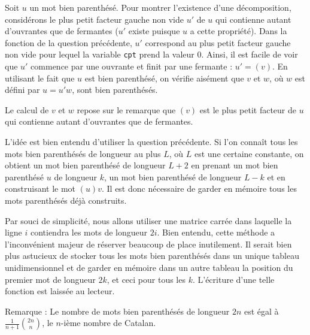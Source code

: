 Soit $u$ un mot bien parenthésé. Pour montrer l'existence d'une décomposition, considérons le plus petit facteur gauche non vide $u'$ de $u$ qui contienne autant d'ouvrantes que de fermantes ($u'$ existe puisque $u$ a cette propriété). Dans la fonction de la question précédente, $u'$ correspond au plus petit facteur gauche non vide pour lequel la variable \texttt{cpt} prend la valeur 0. Ainsi, il est facile de voir que $u'$ commence par une ouvrante et finit par une fermante : $u'=(v)$. En utilisant le fait que $u$ est bien parenthésé, on vérifie aisément que $v$ et $w$, où $w$ est défini par $u=u'w$, sont bien parenthésés.
\medskip

Le calcul de $v$ et $w$ repose sur le remarque que $(v)$ est le plus petit facteur de $u$ qui contienne autant d'ouvrantes que de fermantes.



\Q
L'idée est bien entendu d'utiliser la question précédente. Si l'on connaît tous les mots bien parenthésés de longueur au plus $L$, où $L$ est une certaine constante, on obtient un mot bien parenthésé de longueur $L+2$ en prenant un mot bien parenthésé $u$ de longueur $k$, un mot bien parenthésé de longueur $L-k$ et en construisant le mot $(u)v$. Il est donc nécessaire de garder en mémoire tous les mots parenthésés déjà construits.
\smallskip

Par souci de simplicité, nous allons utiliser une matrice carrée dans laquelle la ligne $i$ contiendra les mots de longueur $2i$. Bien entendu, cette méthode a l'inconvénient majeur de réserver beaucoup de place inutilement. Il serait bien plus astucieux de stocker tous les mots bien parenthésés dans un unique tableau unidimensionnel et de garder en mémoire dans un autre tableau la position du premier mot de longueur $2k$, et ceci pour tous les $k$. L'écriture d'une telle fonction est laissée au lecteur.



Remarque : Le nombre de mots bien parenthésés de longueur $2n$ est égal à $\frac{1}{n+1}\binom{2n}{n}$, le $n$-ième nombre de Catalan.